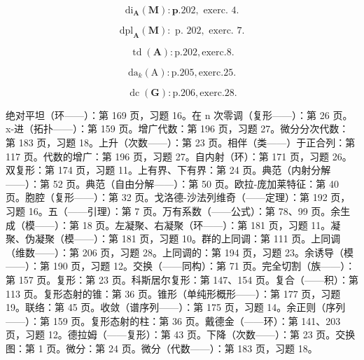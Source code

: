 \[
\mathrm{di} _ {\mathbf {A}} (\mathbf {M}): \mathbf {p}. 2 0 2, \text {   exerc.   } 4.
\]

\[
\mathrm{dpl} _ {\mathbf {A}} (\mathbf {M}): \text { p. } 2 0 2, \text { exerc. } 7.
\]

\[
\operatorname{td} (\mathbf {A}): \mathrm{p.202,exerc.8.}
\]

\[
\mathrm{da} _ {k} (\mathrm{A}): \mathrm{p.205,exerc.25.}
\]

\[
\operatorname{dc} (\mathbf {G}): \mathrm{p.206,exerc.28.}
\]


绝对平坦（环——）：第 169 页，习题 16。在 n 次零调（复形——）：第 26 页。x-进（拓扑——）：第 159 页。增广代数：第 196 页，习题 27。微分分次代数：第 183 页，习题 18。上升（次数——）：第 23 页。相伴（类——）于正合列：第 117 页。代数的增广：第 196 页，习题 27。自内射（环）：第 171 页，习题 26。双复形：第 174 页，习题 11。上有界、下有界：第 24 页。典范（内射分解——）：第 52 页。典范（自由分解——）：第 50 页。欧拉-庞加莱特征：第 40 页。胞腔（复形——）：第 32 页。戈洛德-沙法列维奇（——定理）：第 192 页，习题 16。五（——引理）：第 7 页。万有系数（——公式）：第 78、99 页。余生成（模——）：第 18 页。左凝聚、右凝聚（环——）：第 181 页，习题 11。凝聚、伪凝聚（模——）：第 181 页，习题 10。群的上同调：第 111 页。上同调（维数——）：第 206 页，习题 28。上同调的：第 194 页，习题 23。余诱导（模——）：第 190 页，习题 12。交换（——同构）：第 71 页。完全切割（族——）：第 157 页。复形：第 23 页。科斯居尔复形：第 147、154 页。复合（——积）：第 113 页。复形态射的锥：第 36 页。锥形（单纯形概形——）：第 177 页，习题 19。联络：第 45 页。收敛（谱序列——）：第 175 页，习题 14。余正则（序列——）：第 159 页。复形态射的柱：第 36 页。戴德金（——环）：第 141、203 页，习题 12。德拉姆（——复形）：第 43 页。下降（次数——）：第 23 页。交换图：第 1 页。微分：第 24 页。微分（代数——）：第 183 页，习题 18。

